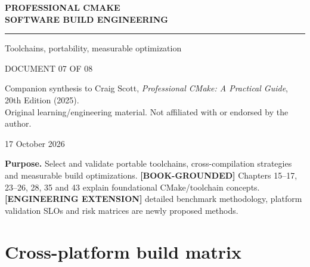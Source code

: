 \documentclass[11pt,letterpaper,oneside]{report}
\begin{document}
\hypersetup{pageanchor=false}\begin{titlepage}
\color{navy}
\vspace*{1.15in}
{\Large\bfseries PROFESSIONAL CMAKE\\[7pt]SOFTWARE BUILD ENGINEERING\par}
\vspace{0.32in}\noindent\textcolor{teal}{\rule{0.9\linewidth}{2.3pt}}\par
\vspace{0.45in}
\par
\vspace{0.3in}
{\Large\color{teal}Toolchains, portability, measurable optimization\par}
\vfill
{\large DOCUMENT 07 OF 08\par}
\vspace{0.1in}
{\small Companion synthesis to Craig Scott, \emph{Professional CMake: A Practical Guide}, 20th Edition (2025).\\
Original learning/engineering material. Not affiliated with or endorsed by the author.\par}
\vspace{0.2in}
{\small 17 October 2026\par}
\end{titlepage}
\hypersetup{pageanchor=true}\clearpage{}\tableofcontents\clearpage{}

\textbf{Purpose.} Select and validate portable toolchains,
cross-compilation strategies and measurable build optimizations.
\textbf{{[}BOOK-GROUNDED{]}} Chapters 15--17, 23--26, 28, 35 and 43
explain foundational CMake/toolchain concepts. \textbf{{[}ENGINEERING
EXTENSION{]}} detailed benchmark methodology, platform validation SLOs
and risk matrices are newly proposed methods.

\chapter{Cross-platform build matrix}\label{cross-platform-build-matrix}
\end{document}
